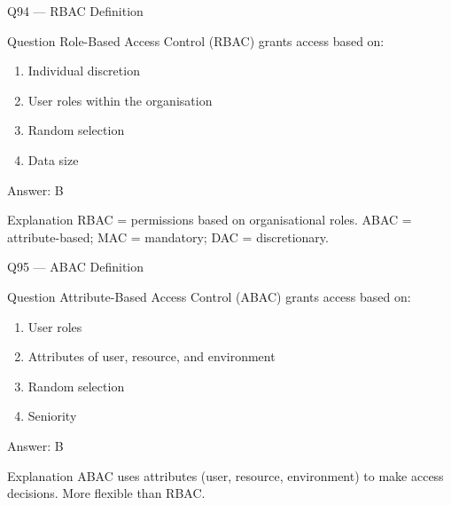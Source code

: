 \documentclass[aspectratio=169,8pt]{beamer}
\begin{document}
	\begin{frame}{Q94 --- RBAC Definition}
		\begin{block}{Question}
			Role-Based Access Control (RBAC) grants access based on:
			\begin{enumerate}
				\item Individual discretion
				\item User roles within the organisation
				\item Random selection
				\item Data size
			\end{enumerate}
		\end{block}
		\begin{exampleblock}{Answer: B}\end{exampleblock}
		\begin{block}{Explanation}
			RBAC = permissions based on organisational roles. ABAC = attribute-based; MAC = mandatory; DAC = discretionary.
		\end{block}
	\end{frame}
	
	\begin{frame}{Q95 --- ABAC Definition}
		\begin{block}{Question}
			Attribute-Based Access Control (ABAC) grants access based on:
			\begin{enumerate}
				\item User roles
				\item Attributes of user, resource, and environment
				\item Random selection
				\item Seniority
			\end{enumerate}
		\end{block}
		\begin{exampleblock}{Answer: B}\end{exampleblock}
		\begin{block}{Explanation}
			ABAC uses attributes (user, resource, environment) to make access decisions. More flexible than RBAC.
		\end{block}
	\end{frame}
	
\end{document}
